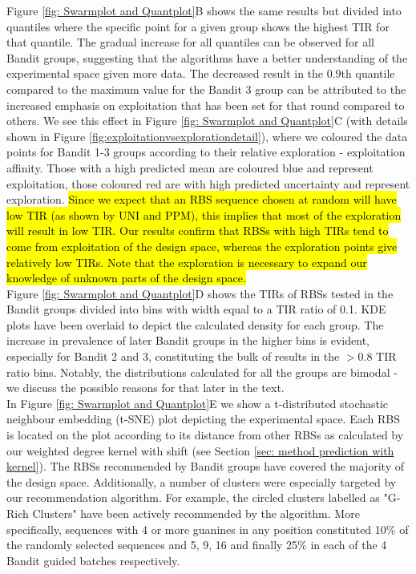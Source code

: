 \documentclass{article}
\begin{document}
Figure \ref{fig: Swarmplot and Quantplot}B shows the same results but divided into quantiles where the specific point for a given group shows the highest TIR for that quantile.
The gradual increase for all quantiles can be observed for all Bandit groups, suggesting that the algorithms have a better understanding of the experimental space given more data.
The decreased result in the 0.9th quantile compared to the maximum value for the Bandit 3 group can be attributed to the increased emphasis on exploitation that has been set for that round compared to others.
We see this effect in Figure \ref{fig: Swarmplot and Quantplot}C (with details shown in Figure  \ref{fig:exploitationvsexplorationdetail}), where we coloured the data points for Bandit 1-3 groups according to their relative exploration - exploitation affinity.
Those with a high predicted mean are coloured blue and represent exploitation, those coloured red are with high predicted uncertainty and represent exploration.
\hl{Since we expect that an RBS sequence chosen at random will have low TIR
(as shown by UNI and PPM), this implies that most of the exploration will result in low TIR.
Our results confirm that
RBSs with high TIRs tend to come from exploitation of the design space,
whereas the exploration points give relatively low TIRs. Note that the exploration is necessary to expand our knowledge of unknown parts of the design space.}\\

Figure \ref{fig: Swarmplot and Quantplot}D shows the TIRs of RBSs tested in the Bandit groups divided into bins with width equal to a TIR ratio of 0.1.
KDE plots have been overlaid to depict the calculated density for each group.
The increase in prevalence of later Bandit groups in the higher bins is evident, especially for Bandit 2 and 3, constituting the bulk of results in the $>0.8$ TIR ratio bins.
Notably, the distributions calculated for all the groups are bimodal - we discuss the possible reasons for that later in the text.\\


In Figure \ref{fig: Swarmplot and Quantplot}E we show a t-distributed stochastic neighbour embedding (t-SNE) \mbox{\cite{tsne2008}} plot depicting the experimental space.
Each RBS is located on the plot according to its distance from other RBSs as calculated by our weighted degree kernel with shift (see Section \mbox{\ref{sec: method prediction with kernel}}).
The RBSs recommended by Bandit groups have covered the majority of the design space. 
Additionally, a number of clusters were especially targeted by our recommendation algorithm.
For example, the circled clusters labelled as "G-Rich Clusters" have been actively recommended by the algorithm.
More specifically, sequences with 4 or more guanines in any position constituted 10\% of the randomly selected sequences and 5, 9, 16 and finally 25\% in each of the 4 Bandit guided batches respectively.
\end{document}
